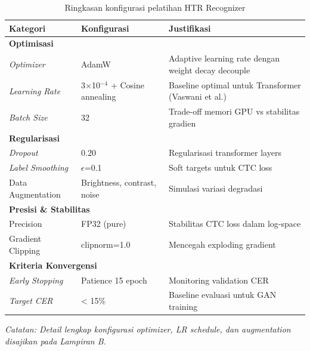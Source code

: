 \documentclass[12pt,a4paper]{article}
\begin{document}
\begin{table}[H]
\centering
\caption{Ringkasan konfigurasi pelatihan HTR Recognizer}
\label{tab:recognizer-training-config}
\small
\begin{tabular}{|l|l|p{6.5cm}|}
\hline
\textbf{Kategori} & \textbf{Konfigurasi} & \textbf{Justifikasi} \\ \hline
\multicolumn{3}{|l|}{\textbf{Optimisasi}} \\ \hline
\textit{Optimizer} & AdamW & Adaptive learning rate dengan weight decay decouple \\ \hline
\textit{Learning Rate} & 3$\times$10$^{-4}$ + Cosine annealing & Baseline optimal untuk Transformer (Vaswani et al.) \\ \hline
\textit{Batch Size} & 32 & Trade-off memori GPU vs stabilitas gradien \\ \hline
\multicolumn{3}{|l|}{\textbf{Regularisasi}} \\ \hline
\textit{Dropout} & 0.20 & Regularisasi transformer layers \\ \hline
\textit{Label Smoothing} & $\epsilon$=0.1 & Soft targets untuk CTC loss \\ \hline
Data Augmentation & Brightness, contrast, noise & Simulasi variasi degradasi \\ \hline
\multicolumn{3}{|l|}{\textbf{Presisi \& Stabilitas}} \\ \hline
Precision & FP32 (pure) & Stabilitas CTC loss dalam log-space \\ \hline
Gradient Clipping & clipnorm=1.0 & Mencegah exploding gradient \\ \hline
\multicolumn{3}{|l|}{\textbf{Kriteria Konvergensi}} \\ \hline
\textit{Early Stopping} & Patience 15 epoch & Monitoring validation CER \\ \hline
\textit{Target CER} & < 15\% & Baseline evaluasi untuk GAN training \\ \hline
\end{tabular}
\end{table}

\textit{Catatan: Detail lengkap konfigurasi optimizer, LR schedule, dan augmentation disajikan pada Lampiran B.}
\end{document}
